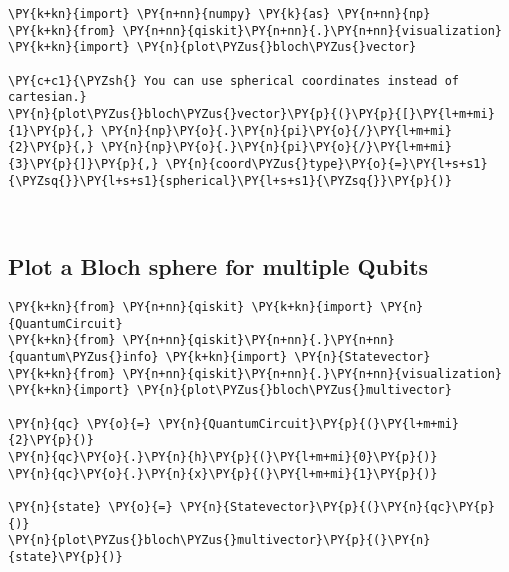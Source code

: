     \begin{tcolorbox}[breakable, size=fbox, boxrule=1pt, pad at break*=1mm,colback=cellbackground, colframe=cellborder]
\begin{Verbatim}[commandchars=\\\{\}]
\PY{k+kn}{import} \PY{n+nn}{numpy} \PY{k}{as} \PY{n+nn}{np}
\PY{k+kn}{from} \PY{n+nn}{qiskit}\PY{n+nn}{.}\PY{n+nn}{visualization} \PY{k+kn}{import} \PY{n}{plot\PYZus{}bloch\PYZus{}vector}
 
\PY{c+c1}{\PYZsh{} You can use spherical coordinates instead of cartesian.}
\PY{n}{plot\PYZus{}bloch\PYZus{}vector}\PY{p}{(}\PY{p}{[}\PY{l+m+mi}{1}\PY{p}{,} \PY{n}{np}\PY{o}{.}\PY{n}{pi}\PY{o}{/}\PY{l+m+mi}{2}\PY{p}{,} \PY{n}{np}\PY{o}{.}\PY{n}{pi}\PY{o}{/}\PY{l+m+mi}{3}\PY{p}{]}\PY{p}{,} \PY{n}{coord\PYZus{}type}\PY{o}{=}\PY{l+s+s1}{\PYZsq{}}\PY{l+s+s1}{spherical}\PY{l+s+s1}{\PYZsq{}}\PY{p}{)}
\end{Verbatim}
\end{tcolorbox}
 
            
    
    \begin{center}
    \end{center}
    { \hspace*{\fill} \\}
    

    \hypertarget{plot-a-bloch-sphere-for-multiple-qubits}{%
\subsection*{Plot a Bloch sphere for multiple
Qubits}\label{plot-a-bloch-sphere-for-multiple-qubits}}

    \begin{tcolorbox}[breakable, size=fbox, boxrule=1pt, pad at break*=1mm,colback=cellbackground, colframe=cellborder]
\begin{Verbatim}[commandchars=\\\{\}]
\PY{k+kn}{from} \PY{n+nn}{qiskit} \PY{k+kn}{import} \PY{n}{QuantumCircuit}
\PY{k+kn}{from} \PY{n+nn}{qiskit}\PY{n+nn}{.}\PY{n+nn}{quantum\PYZus{}info} \PY{k+kn}{import} \PY{n}{Statevector}
\PY{k+kn}{from} \PY{n+nn}{qiskit}\PY{n+nn}{.}\PY{n+nn}{visualization} \PY{k+kn}{import} \PY{n}{plot\PYZus{}bloch\PYZus{}multivector}
 
\PY{n}{qc} \PY{o}{=} \PY{n}{QuantumCircuit}\PY{p}{(}\PY{l+m+mi}{2}\PY{p}{)}
\PY{n}{qc}\PY{o}{.}\PY{n}{h}\PY{p}{(}\PY{l+m+mi}{0}\PY{p}{)}
\PY{n}{qc}\PY{o}{.}\PY{n}{x}\PY{p}{(}\PY{l+m+mi}{1}\PY{p}{)}
 
\PY{n}{state} \PY{o}{=} \PY{n}{Statevector}\PY{p}{(}\PY{n}{qc}\PY{p}{)}
\PY{n}{plot\PYZus{}bloch\PYZus{}multivector}\PY{p}{(}\PY{n}{state}\PY{p}{)}
\end{Verbatim}
\end{tcolorbox}
 
            
    
    \begin{center}
    \end{center}
    { \hspace*{\fill} \\}
    

